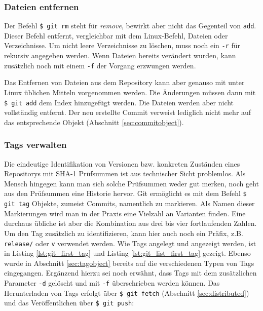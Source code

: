 
\subsubsection{Dateien entfernen}
Der Befehl \texttt{\$ git rm} steht für \textit{remove}, bewirkt aber nicht das
Gegenteil von \texttt{add}. Dieser Befehl entfernt, vergleichbar mit dem
Linux-Befehl, Dateien oder Verzeichnisse. Um nicht leere Verzeichnisse zu
löschen, muss noch ein \texttt{-r} für rekursiv angegeben werden. Wenn Dateien
bereits verändert wurden, kann zusätzlich noch mit einem \texttt{-f} der
Vorgang erzwungen werden.


Das Entfernen von Dateien aus dem Repository kann aber genauso mit unter Linux
üblichen Mitteln vorgenommen werden. Die Änderungen müssen dann mit \texttt{\$
git add} dem Index hinzugefügt werden. Die Dateien werden aber nicht
vollständig entfernt. Der neu erstellte Commit verweist lediglich nicht mehr
auf das entsprechende Objekt (Abschnitt \ref{sec:commitobject}).
\cite[S.~43-44]{gitosp}

\subsubsection{Tags verwalten}\label{sec:managetags}
Die eindeutige Identifikation von Versionen bzw. konkreten Zuständen eines
Repositorys mit \gls{SHA-1} Prüfsummen ist aus technischer Sicht problemlos.
Als Mensch hingegen kann man sich solche Prüfsummen weder gut merken, noch geht
aus den Prüfsummen eine Historie hervor. Git ermöglicht es mit dem Befehl
\texttt{\$ git tag} Objekte, zumeist Commits, namentlich zu markieren. Als
Namen dieser Markierungen wird man in der Praxis eine Vielzahl an Varianten
finden. Eine durchaus übliche ist aber die Kombination aus drei bis vier
fortlaufenden Zahlen. Um den Tag zusätzlich zu identifizieren, kann hier auch
noch ein Präfix, z.B. \texttt{release/} oder \texttt{v} verwendet werden. Wie
Tags angelegt und angezeigt werden, ist in Listing \ref{lst:git_first_tag} und
Listing \ref{lst:git_list_first_tag} gezeigt.  Ebenso wurde in Abschnitt
\ref{sec:tagobject} bereits auf die verschiedenen Typen von Tags eingegangen.
Ergänzend hierzu sei noch erwähnt, dass Tags mit dem zusätzlichen Parameter
\texttt{-d} gelöscht und mit \texttt{-f} überschrieben werden können. Das
Herunterladen von Tags erfolgt über \texttt{\$ git fetch} (Abschnitt
\ref{sec:distributed}) und das Veröffentlichen über \texttt{\$ git push}:

